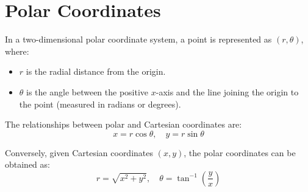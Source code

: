 \documentclass{article}
\begin{document}
\section*{Polar Coordinates}

In a two-dimensional polar coordinate system, a point is represented as \((r, \theta)\), where:
\begin{itemize}
    \item \(r\) is the radial distance from the origin.
    \item \(\theta\) is the angle between the positive \(x\)-axis and the line joining the origin to the point (measured in radians or degrees).
\end{itemize}

The relationships between polar and Cartesian coordinates are:
\[
x = r\cos\theta, \quad y = r\sin\theta
\]

Conversely, given Cartesian coordinates \((x, y)\), the polar coordinates can be obtained as:
\[
r = \sqrt{x^2 + y^2}, \quad \theta = \tan^{-1}\left(\frac{y}{x}\right)
\]
\end{document}
